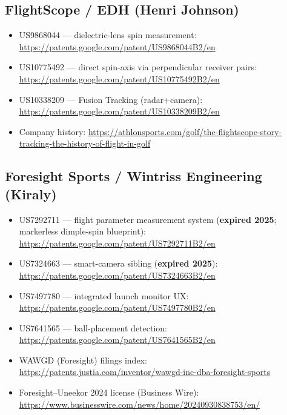 \subsection*{FlightScope / EDH (Henri Johnson)}
\begin{itemize}\small
\item US9868044 --- dielectric-lens spin measurement:
  \url{https://patents.google.com/patent/US9868044B2/en}
\item US10775492 --- direct spin-axis via perpendicular receiver pairs:
  \url{https://patents.google.com/patent/US10775492B2/en}
\item US10338209 --- Fusion Tracking (radar+camera):
  \url{https://patents.google.com/patent/US10338209B2/en}
\item Company history:
  \url{https://athlonsports.com/golf/the-flightscope-story-tracking-the-history-of-flight-in-golf}
\end{itemize}

\subsection*{Foresight Sports / Wintriss Engineering (Kiraly)}
\begin{itemize}\small
\item US7292711 --- flight parameter measurement system
  (\textbf{expired 2025}; markerless dimple-spin blueprint):
  \url{https://patents.google.com/patent/US7292711B2/en}
\item US7324663 --- smart-camera sibling (\textbf{expired 2025}):
  \url{https://patents.google.com/patent/US7324663B2/en}
\item US7497780 --- integrated launch monitor UX:
  \url{https://patents.google.com/patent/US7497780B2/en}
\item US7641565 --- ball-placement detection:
  \url{https://patents.google.com/patent/US7641565B2/en}
\item WAWGD (Foresight) filings index:
  \url{https://patents.justia.com/inventor/wawgd-inc-dba-foresight-sports}
\item Foresight--Uneekor 2024 license (Business Wire):
  \url{https://www.businesswire.com/news/home/20240930838753/en/}
\end{itemize}

